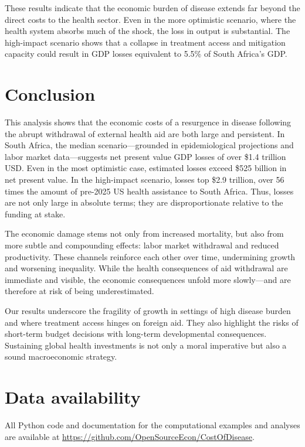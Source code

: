 \documentclass[letterpaper,12pt]{article}
\theoremstyle{definition}
\begin{document}
\begin{spacing}{1.5}
These results indicate that the economic burden of disease extends far beyond the direct costs to the health sector. Even in the more optimistic scenario, where the health system absorbs much of the shock, the loss in output is substantial. The high-impact scenario shows that a collapse in treatment access and mitigation capacity could result in GDP losses equivalent to 5.5\% of South Africa's GDP.


\section{Conclusion}\label{SecConc}


This analysis shows that the economic costs of a resurgence in disease following the abrupt withdrawal of external health aid are both large and persistent. In South Africa, the median scenario—grounded in epidemiological projections and labor market data—suggests net present value GDP losses of over \$1.4 trillion USD. Even in the most optimistic case, estimated losses exceed \$525 billion in net present value. In the high-impact scenario, losses top \$2.9 trillion, over 56 times the amount of pre-2025 US health assistance to South Africa. Thus, losses are not only large in absolute terms; they are disproportionate relative to the funding at stake.

The economic damage stems not only from increased mortality, but also from more subtle and compounding effects: labor market withdrawal and reduced productivity. These channels reinforce each other over time, undermining growth and worsening inequality. While the health consequences of aid withdrawal are immediate and visible, the economic consequences unfold more slowly—and are therefore at risk of being underestimated.

Our results underscore the fragility of growth in settings of high disease burden and where treatment access hinges on foreign aid. They also highlight the risks of short-term budget decisions with long-term developmental consequences. Sustaining global health investments is not only a moral imperative but also a sound macroeconomic strategy.


\end{spacing}

\section*{Data availability}

All Python code and documentation for the computational examples and analyses are available at \href{https://github.com/OpenSourceEcon/CostOfDisease}{https://github.com/OpenSourceEcon/CostOfDisease}.

\end{document}
